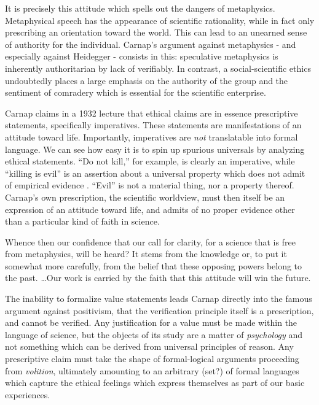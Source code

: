 \documentclass[leqno, 12pt]{turabian-researchpaper}
\begin{document}
	It is precisely this attitude which spells out the dangers of metaphysics. Metaphysical
	speech has the appearance of scientific rationality, while in fact only
	prescribing an orientation toward the world. This can lead to an unearned sense
	of authority for the individual. Carnap's argument against metaphysics - and
	especially against Heidegger - consists in this: speculative metaphysics is inherently
	authoritarian by lack of verifiably. In contrast, a social-scientific ethics undoubtedly
	places a large emphasis on the authority of the group and the sentiment of comradery
	which is essential for the scientific enterprise.

	Carnap claims in a 1932 lecture that ethical claims are in essence prescriptive
	statements, specifically imperatives. These statements are manifestations of an
	attitude toward life. Importantly, imperatives are \emph{not} translatable
	into formal language. We can see how easy it is to spin up spurious universals
	by analyzing ethical statements. \enquote{Do not kill,} for example, is
	clearly an imperative, while \enquote{killing is evil} is an assertion about a
	universal property which does not admit of empirical evidence \autocite[\S1.4]{carnap1996}.
	\enquote{Evil} is not a material thing, nor a property thereof. Carnap's own prescription,
	the scientific worldview, must then itself be an expression of an attitude toward
	life, and admits of no proper evidence other than a particular kind of faith
	in science.

	\begin{displayquote}
		 Whence then our confidence that our call for
		clarity, for a science that is free from metaphysics, will be heard? It
		stems from the knowledge or, to put it somewhat more carefully, from the
		belief that these opposing powers belong to the past. \dots Our work is carried
		by the faith that this attitude will win the future.
	\end{displayquote}

	The inability to formalize value statements leads Carnap directly into the famous
	argument against positivism, that the verification principle itself is a
	prescription, and cannot be verified. Any justification for a value must be
	made within the language of science, but the objects of its study are a matter
	of \emph{psychology} and not something which can be derived from universal
	principles of reason. Any prescriptive claim must take the shape of formal-logical
	arguments proceeding from \emph{volition}, ultimately amounting to an arbitrary
	(set?) of formal languages which capture the ethical feelings which express
	themselves as part of our basic experiences.
\end{document}
